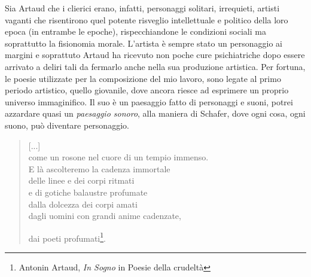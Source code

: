 Sia Artaud che i clierici erano, infatti, personaggi solitari, irrequieti, artisti vaganti che risentirono quel potente risveglio intellettuale e politico della loro epoca (in entrambe le epoche), rispecchiandone le condizioni sociali ma soprattutto la fisionomia morale. L'artista è sempre stato un personaggio ai margini e soprattuto Artaud ha ricevuto non poche cure psichiatriche dopo essere arrivato a deliri tali da fermarlo anche nella sua produzione artistica. Per fortuna, le poesie utilizzate per la composizione del mio lavoro, sono legate al primo periodo artistico, quello giovanile, dove ancora riesce ad esprimere un proprio universo immaginifico. Il suo è un paesaggio fatto di personaggi e suoni, potrei azzardare quasi un \textit{paesaggio sonoro}, alla maniera di Schafer, dove ogni cosa, ogni suono, può diventare personaggio.

\begin{verse}
[...] \\
come un rosone nel cuore di un tempio immenso. \\
E là ascolteremo la cadenza immortale \\
delle linee e dei corpi ritmati \\
e di gotiche balaustre profumate \\
dalla dolcezza dei corpi amati \\
dagli uomini con grandi anime cadenzate, \\
\centerline{dai poeti profumati\footnote{Antonin Artaud, \textit{In Sogno} in Poesie della crudeltà}.}
\end{verse}

